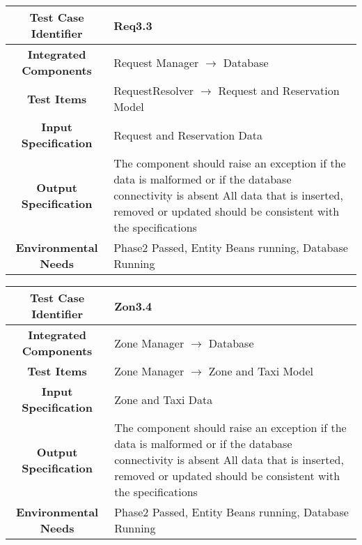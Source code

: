 \documentclass[11pt, a4paper,titlepage]{article}
\begin{document}
		\begin{tabularx}{\textwidth}{| c|X|}
			\hline \textbf{Test Case Identifier} & \label{Req3.3}Req3.3 \\
			\hline \textbf{Integrated Components} & Request Manager $\rightarrow $ Database \\
			\hline \textbf{Test Items} & RequestResolver $\rightarrow $ Request and Reservation Model \\
			\hline \textbf{Input Specification} & Request and Reservation Data \\
			\hline \textbf{Output Specification} & The component should raise an exception if the data is malformed or if the database connectivity is absent \newline
			All data that is inserted, removed or updated should be consistent with the specifications\\
			\hline \textbf{Environmental Needs} & Phase2 Passed, Entity Beans running, Database Running \\
			\hline
		\end{tabularx}
		\newline
		
		\begin{tabularx}{\textwidth}{| c|X|}
			\hline \textbf{Test Case Identifier} & \label{Zon3.4}Zon3.4 \\
			\hline \textbf{Integrated Components} & Zone Manager $\rightarrow $ Database \\
			\hline \textbf{Test Items} &  Zone Manager $\rightarrow $ Zone and Taxi Model \\
			\hline \textbf{Input Specification} & Zone and Taxi Data \\
			\hline \textbf{Output Specification} & The component should raise an exception if the data is malformed or if the database connectivity is absent \newline
			All data that is inserted, removed or updated should be consistent with the specifications\\
			\hline \textbf{Environmental Needs} & Phase2 Passed, Entity Beans running, Database Running \\
			\hline
		\end{tabularx}
		\newline
\end{document}

